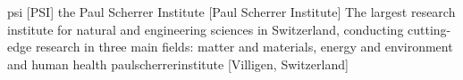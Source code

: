\newglsXinstitution%
{psi}%
[PSI]%
{the Paul Scherrer Institute}%
[Paul Scherrer Institute]%
{The largest research institute for natural and engineering sciences in Switzerland, conducting cutting-edge research in three main fields: matter and materials, energy and environment and human health \cite{website:Paul_Scherrer_Institute}}%
{paulscherrerinstitute}%
[Villigen, Switzerland]%